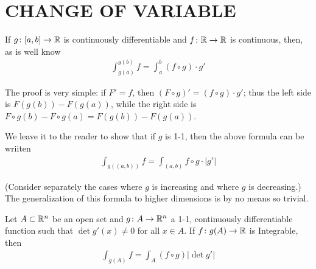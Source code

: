 \clearpage
\section[\textsc{change of variable}]{CHANGE OF VARIABLE}
If $g\colon{}[a,b]\to \mathbb{R}$ is continuously differentiable and $f\colon{} \mathbb{R}\to \mathbb{R}$
is continuous, then, as is well know 
\begin{align*}
    \int_{g(a)}^{g(b)} f = \int_a^b (f\circ g)\cdot g'
\end{align*}

The proof is very simple: if $F' = f$, then $(F\circ g)' = (f\circ g)\cdot g'$;
thus the left side is $F(g(b)) - F(g(a))$, while the right side is $F\circ g(b) - F\circ g(a)
= F(g(b)) - F(g(a))$.

We leave it to the reader to show that if $g$ is 1-1, then the above formula can be wriiten
\begin{align*}
    \int_{g((a,b))} f = \int_{(a,b)} f\circ g\cdot |g'|
\end{align*} 

(Consider separately the cases where $g$ is increasing and where
$g$ is decreasing.) The generalization of this formula to higher
dimensions is by no means so trivial.


\begin{theorem}
    Let $A\subset \mathbb{R}^n$ be an open set and $g\colon{}A\to \mathbb{R}^n$ a 1-1, continuously differentiable
    function such that $\det g'(x)\neq 0$ for all $x\in A$. If $f\colon{}g(A)\to \mathbb{R}$ is Integrable, then
    \begin{align*}
        \int_{g(A)} f = \int_A (f\circ g)|\det g'|
    \end{align*} 
\end{theorem}

